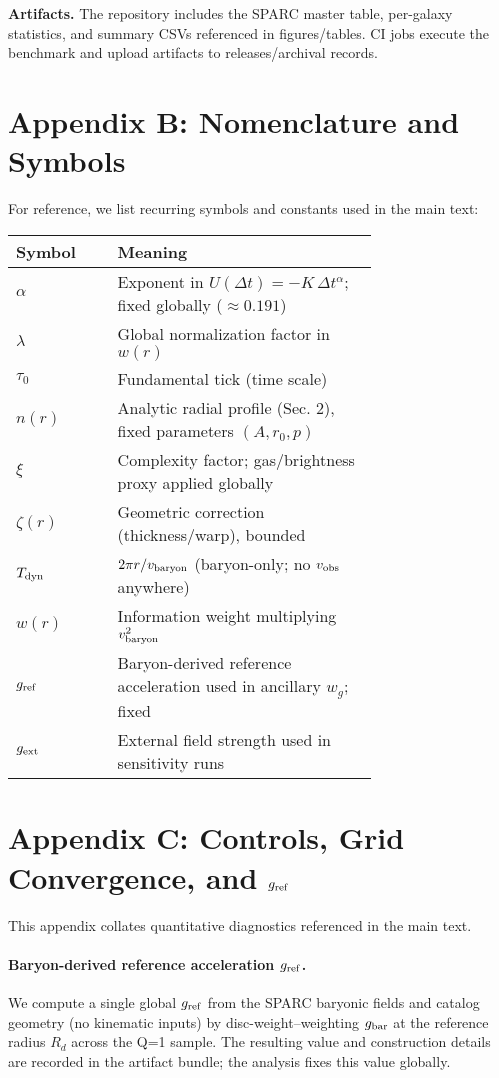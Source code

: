 \documentclass[usenatbib]{mnras}
\begin{document}
\noindent\textbf{Artifacts.} The repository includes the SPARC master table, per-galaxy statistics, and summary CSVs referenced in figures/tables. CI jobs execute the benchmark and upload artifacts to releases/archival records.

\section*{Appendix B: Nomenclature and Symbols}
\noindent For reference, we list recurring symbols and constants used in the main text:
\begin{table}
\centering
\small
\setlength{\tabcolsep}{6pt}
\label{tab:nomenclature}
\begin{tabular}{l p{0.72\linewidth}}
\toprule
\textbf{Symbol} & \textbf{Meaning} \\
\midrule
$\alpha$ & Exponent in $U(\Delta t)=-K\,\Delta t^{\alpha}$; fixed globally ($\approx0.191$) \\
$\lambda$ & Global normalization factor in $w(r)$ \\
$\tau_0$ & Fundamental tick (time scale) \\
$n(r)$ & Analytic radial profile (Sec. 2), fixed parameters $(A,r_0,p)$ \\
$\xi$ & Complexity factor; gas/brightness proxy applied globally \\
$\zeta(r)$ & Geometric correction (thickness/warp), bounded \\
$T_{\rm dyn}$ & $2\pi r/v_{\rm baryon}$ (baryon-only; no $v_{\rm obs}$ anywhere) \\
$w(r)$ & Information weight multiplying $v_{\rm baryon}^2$ \\
$g_{\rm ref}$ & Baryon-derived reference acceleration used in ancillary $w_g$; fixed \\
$g_{\rm ext}$ & External field strength used in sensitivity runs \\
\bottomrule
\end{tabular}
\end{table}

\section*{Appendix C: Controls, Grid Convergence, and $g_{\rm ref}$}
\noindent
This appendix collates quantitative diagnostics referenced in the main text.

\paragraph{Baryon-derived reference acceleration $g_{\rm ref}$.}
We compute a single global $g_{\rm ref}$ from the SPARC baryonic fields and catalog geometry (no kinematic inputs) by disc-weight–weighting $g_{\rm bar}$ at the reference radius $R_d$ across the Q=1 sample. The resulting value and construction details are recorded in the artifact bundle; the analysis fixes this value globally.
\end{document}
